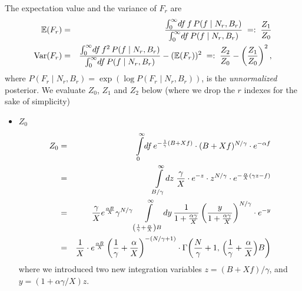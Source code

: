 \documentclass[letter,10pt,oneside]{article}
\newcommand{\ba}{\begin{eqnarray*}}
\newcommand{\ea}{\end{eqnarray*}}
\newcommand{\+}{^\dagger}
\begin{document}
\begin{appendix}
The expectation value and the variance of $F_r$ are
\ba
  \mathbb{E}(F_r) &=& \frac{\intop_0^\infty \! df \, f\, P(f\;|\;N_r, B_r)}{\intop_0^\infty \! df \, P(f\;|\;N_r, B_r)} \;=:\; \frac{Z_1}{Z_0}\\
  \text{Var}(F_r) &=& \frac{\intop_0^\infty \! df \, f^2\, P(f\;|\;N_r, B_r)}{\intop_0^\infty \! df \, P(f\;|\;N_r, B_r)} -  (\mathbb{E}(F_r))^2  \;=:\; \frac{Z_2}{Z_0} - \left(\frac{Z_1}{Z_0}\right)^2,
\ea
where $P(F_r\;|\;N_r, B_r) = \exp(\log P(F_r\;|\;N_r, B_r))$, is the \emph{unnormalized} posterior.
We evaluate $Z_0$, $Z_1$ and $Z_2$ below (where we drop the $r$ indexes for the sake of simplicity)
\begin{itemize}
  \item $Z_0$ 
  \ba
    Z_0 &=& \intop_0^\infty \! df \, e^{-\frac{1}{\gamma}(B + Xf)} \cdot (B + Xf)^{N/\gamma} \cdot e^{-\alpha f}
    \\
    &=& \intop_{B/\gamma}^\infty \! dz\; \frac{\gamma}{X} \cdot e^{-z}\cdot z^{N/\gamma} \cdot e^{-\frac{\alpha}{X}(\gamma z - f)}
    \\
    &=& \frac{\gamma}{X} e^{\frac{\alpha B}{X}} \gamma^{N/\gamma} \intop_{\left(\frac{1}{\gamma} + \frac{\alpha}{X}\right)B}^\infty \!dy\, \frac{1}{1 + \frac{\alpha \gamma}{X}} \left(\frac{y}{1 + \frac{\alpha \gamma}{X}}\right)^{N/\gamma} \cdot e^{-y} 
    \\
    &=& \frac{1}{X}\cdot e^\frac{\alpha B}{X} \left(\frac{1}{\gamma} + \frac{\alpha}{X}\right)^{-(N/\gamma + 1)} \cdot \Gamma\!\left(\frac{N}{\gamma} + 1,\,\Big(\frac{1}{\gamma} + \frac{\alpha}{X}\Big)B\right)
  \ea
  where we introduced two new integration variables $z = (B + Xf) / \gamma$, and $y = (1 + \alpha\gamma / X)z$.


\end{itemize}
\end{appendix}
\end{document}
